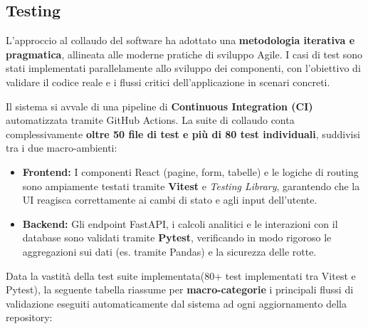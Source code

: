 \subsection{Testing}
L'approccio al collaudo del software ha adottato una \textbf{metodologia iterativa e pragmatica}, allineata alle moderne pratiche di sviluppo Agile. I casi di test sono stati implementati parallelamente allo sviluppo dei componenti, con l'obiettivo di validare il codice reale e i flussi critici dell'applicazione in scenari concreti.

Il sistema si avvale di una pipeline di \textbf{Continuous Integration (CI)} automatizzata tramite GitHub Actions. La suite di collaudo conta complessivamente \textbf{oltre 50 file di test e più di 80 test individuali}, suddivisi tra i due macro-ambienti:
\begin{itemize}
    \item \textbf{Frontend:} I componenti React (pagine, form, tabelle) e le logiche di routing sono ampiamente testati tramite \textbf{Vitest} e \textit{Testing Library}, garantendo che la UI reagisca correttamente ai cambi di stato e agli input dell'utente.
    \item \textbf{Backend:} Gli endpoint FastAPI, i calcoli analitici e le interazioni con il database sono validati tramite \textbf{Pytest}, verificando in modo rigoroso le aggregazioni sui dati (es. tramite Pandas) e la sicurezza delle rotte.
\end{itemize}

Data la vastità della test suite implementata(80+ test implementati tra Vitest e Pytest), la seguente tabella riassume per \textbf{macro-categorie} i principali flussi di validazione eseguiti automaticamente dal sistema ad ogni aggiornamento della repository:

